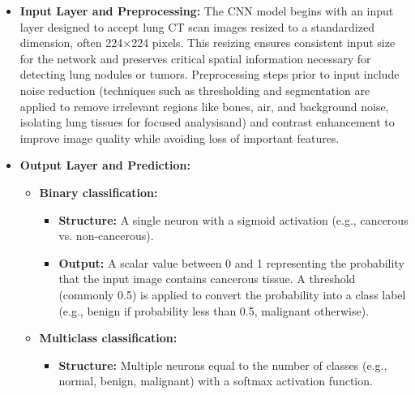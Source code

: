 \begin{itemize}
    \item \textbf{Input Layer and Preprocessing:} The CNN model begins with an input layer designed 
    to accept lung CT scan images resized to a standardized dimension, often 224×224 pixels. This 
    resizing ensures consistent input size for the network and preserves critical spatial 
    information necessary for detecting lung nodules or tumors. Preprocessing steps prior to input 
    include noise reduction (techniques such as thresholding and segmentation are applied to remove 
    irrelevant regions like bones, air, and background noise, isolating lung tissues for focused 
    analysisand) and contrast enhancement to improve image quality while avoiding loss of important 
    features. \cite{aplb2024}

    \item \textbf{Output Layer and Prediction:} 
        \begin{itemize}
            \item \textbf{Binary classification:}
                \begin{itemize}
                    \item \textbf{Structure:} A single neuron with a sigmoid activation (e.g., 
                    cancerous vs. non-cancerous).
                    
                    \item \textbf{Output:} A scalar value between 0 and 1 representing the 
                    probability that the input image contains cancerous tissue. A threshold 
                    (commonly 0.5) is applied to convert the probability into a class label 
                    (e.g., benign if probability less than 0.5, malignant otherwise).
                \end{itemize}

            \item \textbf{Multiclass classification:} 
                \begin{itemize}
                    \item \textbf{Structure:} Multiple neurons equal to the number of classes (e.g., 
                    normal, benign, malignant) with a softmax activation function.
                    

\end{itemize}
\end{itemize}
\end{itemize}
